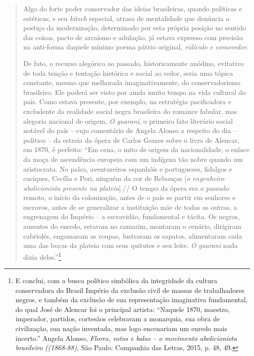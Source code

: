 \begin{quote}
Algo do forte poder conservador das ideias brasileiras, quando políticas
e estéticas, e seu \emph{kitsch} especial, atraso de mentalidade que
denúncia o postiço da modernização, determinado por esta própria posição
no sentido das coisas, pacto de arcaísmo e adulação, já estava expresso
com precisão na anti-forma daquele mínimo poema pátrio original,
\emph{ridículo e comovedor}.

De fato, o recurso alegórico ao passado, historicamente anódino,
evitativo de toda tenção e tentação histórica e social ao redor, seria
uma tópica constante, mesmo que melhorada imaginativamente, do
conservadorismo brasileiro. Ele poderá ser visto por ainda muito tempo
na vida cultural do país. Como estava presente, por exemplo, na
estratégia pacificadora e excludente da realidade social negra
brasileira do romance fabular, mas alegoria nacional de origem, \emph{O
guarani}, o primeiro fato literário social notável do país -- cujo
comentário de Angela Alonso a respeito do dia -- político -- da estreia
da ópera de Carlos Gomes sobre o livro de Alencar, em 1870, é perfeito:
``Em cena, o mito de origem da nacionalidade, o enlace da moça de
ascendência europeia com um indígena tão nobre quando um aristocrata. No
palco, aventureiros espanhóis e portugueses, fidalgos e caciques,
Cecília e Peri, ninguém da cor de Rebouças {[}\emph{o engenheiro
abolicionista presente na plateia}{]}.// O tempo da ópera era o passado
remoto, o início da colonização, antes de o país se partir em senhores e
escravos, antes de se generalizar a instituição mãe de todas as outras,
a engrenagem do Império -- a escravidão, fundamental e tácita. Os
negros, ausentes do enredo, estavam no camarim, montaram o cenário,
dirigiram cabriolés, engomaram as roupas, lustraram os sapatos,
alimentaram cada uma das bocas da plateia com seus quitutes e seu leite.
\emph{O guarani} nada dizia deles.''\footnote{E conclui, com a busca
  político simbólica da integridade da cultura conservadora do Brasil
  Império da exclusão civil de massas de trabalhadores negros, e também
  da exclusão de sua representação imaginativa fundamental, do qual José
  de Alencar foi o principal artista: ``Naquele 1870, maestro,
  imperador, partidos, cortesãos celebravam a monarquia, sua obra de
  civilização, sua nação inventada, mas logo encenariam um enredo mais
  incerto.'' Angela Alonso, \emph{Flores, votos e balas -- o movimento
  abolicionista brasileiro ((1868-88)}, São Paulo: Companhia das Letras,
  2015, p. 48, 49.}


\end{quote}
